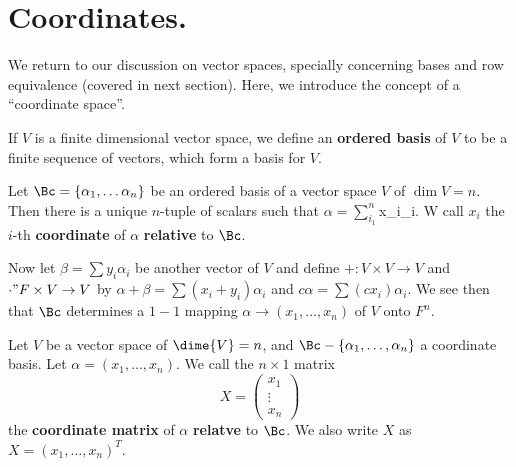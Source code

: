 
\section{Coordinates.}
\label{section1}
 
We return to our discussion on vector spaces, specially concerning bases and row equivalence
(covered in next section). Here, we introduce the concept of a ``coordinate space''.

\begin{definition}
    If $V$ is a finite dimensional vector space, we define an  \textbf{ordered basis} of $V$ to be a
    finite sequence of vectors, which form a basis for  $V$.
\end{definition}

Let $\Bc=\{\alpha_1, \dots \alpha_n\}$ be an ordered basis of a vector space $V$ of $\dim{V}=n$.
Then there is a unique $n$-tuple of scalars such that  $\alpha=\sum_{i_1}^n${x_i\alpha_i}. W call
$x_i$ the  $i$-th  \textbf{coordinate} of $\alpha$  \textbf{relative} to $\Bc$.

Now let  $\beta=\sum{y_i\alpha_i}$ be another vector of $V$ and define  $+:V \times V \rightarrow V$
and  $\cdot"F \times V \rightarrow V$ by $\alpha+\beta=\sum{(x_i+y_i)\alpha_i}$ and
$c\alpha=\sum{(cx_i)\alpha_i}$. We see then that $\Bc$ determines a  $1-1$ mapping  $\alpha
\rightarrow (x_1, \dots, x_n)$ of $V$ onto  $F^n$.

\begin{definition}
    Let $V$ be a vector space of  $\dime{V}=n$, and $\Bc-\{\alpha_1, \dots, \alpha_n\}$ a coordinate
    basis. Let $\alpha=(x_1, \dots, x_n)$. We call the $n \times 1$ matrix
    \begin{equation}
        X=\begin{pmatrix}
            x_1 \\
            \vdots \\
            x_n
          \end{pmatrix}
    \end{equation}
    the \textbf{coordinate matrix} of $\alpha$  \textbf{relatve} to $\Bc$. We also write $X$ as
    $X=(x_1, \dots, x_n)^T$.
\end{definition}

